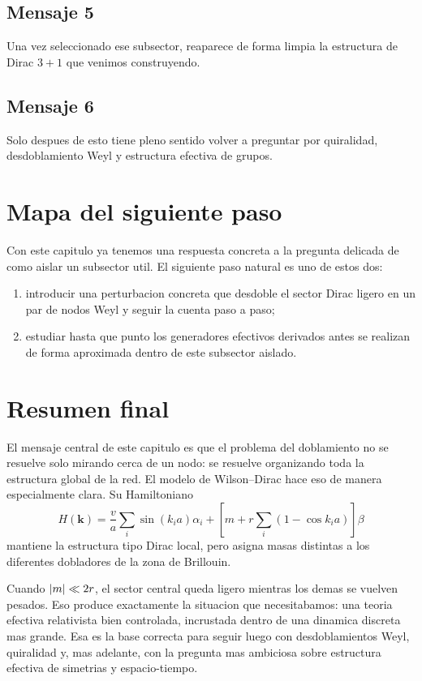\subsection*{Mensaje 5}
Una vez seleccionado ese subsector, reaparece de forma limpia la estructura de Dirac \(3+1\) que venimos construyendo.

\subsection*{Mensaje 6}
Solo despues de esto tiene pleno sentido volver a preguntar por quiralidad, desdoblamiento Weyl y estructura efectiva de grupos.

\section{Mapa del siguiente paso}
Con este capitulo ya tenemos una respuesta concreta a la pregunta delicada de como aislar un subsector util. El siguiente paso natural es uno de estos dos:
\begin{enumerate}[label=\arabic*.]
    \item introducir una perturbacion concreta que desdoble el sector Dirac ligero en un par de nodos Weyl y seguir la cuenta paso a paso;
    \item estudiar hasta que punto los generadores efectivos derivados antes se realizan de forma aproximada dentro de este subsector aislado.
\end{enumerate}

\section{Resumen final}
El mensaje central de este capitulo es que el problema del doblamiento no se resuelve solo mirando cerca de un nodo: se resuelve organizando toda la estructura global de la red. El modelo de Wilson--Dirac hace eso de manera especialmente clara. Su Hamiltoniano
\[
H(\bm{k})=
\frac{v}{a}\sum_i \sin(k_i a)\alpha_i
+
\left[m+r\sum_i(1-\cos k_i a)\right]\beta
\]
mantiene la estructura tipo Dirac local, pero asigna masas distintas a los diferentes dobladores de la zona de Brillouin.

Cuando \(\abs{m}\ll 2r\), el sector central queda ligero mientras los demas se vuelven pesados. Eso produce exactamente la situacion que necesitabamos: una teoria efectiva relativista bien controlada, incrustada dentro de una dinamica discreta mas grande. Esa es la base correcta para seguir luego con desdoblamientos Weyl, quiralidad y, mas adelante, con la pregunta mas ambiciosa sobre estructura efectiva de simetrias y espacio-tiempo.
